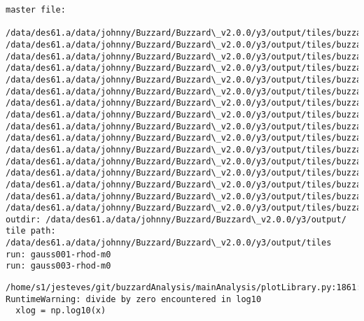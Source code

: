 \documentclass[11pt]{article}
\begin{document}
    \begin{Verbatim}[commandchars=\\\{\}]
master file: 
 /data/des61.a/data/johnny/Buzzard/Buzzard\_v2.0.0/y3/output/tiles/buzzard\_v2.0.0\_copa\_golden\_00000.hdf5
/data/des61.a/data/johnny/Buzzard/Buzzard\_v2.0.0/y3/output/tiles/buzzard\_v2.0.0\_copa\_golden\_00016.hdf5
/data/des61.a/data/johnny/Buzzard/Buzzard\_v2.0.0/y3/output/tiles/buzzard\_v2.0.0\_copa\_golden\_00017.hdf5
/data/des61.a/data/johnny/Buzzard/Buzzard\_v2.0.0/y3/output/tiles/buzzard\_v2.0.0\_copa\_golden\_00018.hdf5
/data/des61.a/data/johnny/Buzzard/Buzzard\_v2.0.0/y3/output/tiles/buzzard\_v2.0.0\_copa\_golden\_00019.hdf5
/data/des61.a/data/johnny/Buzzard/Buzzard\_v2.0.0/y3/output/tiles/buzzard\_v2.0.0\_copa\_golden\_00020.hdf5
/data/des61.a/data/johnny/Buzzard/Buzzard\_v2.0.0/y3/output/tiles/buzzard\_v2.0.0\_copa\_golden\_00022.hdf5
/data/des61.a/data/johnny/Buzzard/Buzzard\_v2.0.0/y3/output/tiles/buzzard\_v2.0.0\_copa\_golden\_00032.hdf5
/data/des61.a/data/johnny/Buzzard/Buzzard\_v2.0.0/y3/output/tiles/buzzard\_v2.0.0\_copa\_golden\_00033.hdf5
/data/des61.a/data/johnny/Buzzard/Buzzard\_v2.0.0/y3/output/tiles/buzzard\_v2.0.0\_copa\_golden\_00034.hdf5
/data/des61.a/data/johnny/Buzzard/Buzzard\_v2.0.0/y3/output/tiles/buzzard\_v2.0.0\_copa\_golden\_00035.hdf5
/data/des61.a/data/johnny/Buzzard/Buzzard\_v2.0.0/y3/output/tiles/buzzard\_v2.0.0\_copa\_golden\_00038.hdf5
/data/des61.a/data/johnny/Buzzard/Buzzard\_v2.0.0/y3/output/tiles/buzzard\_v2.0.0\_copa\_golden\_00044.hdf5
/data/des61.a/data/johnny/Buzzard/Buzzard\_v2.0.0/y3/output/tiles/buzzard\_v2.0.0\_copa\_golden\_00045.hdf5
/data/des61.a/data/johnny/Buzzard/Buzzard\_v2.0.0/y3/output/tiles/buzzard\_v2.0.0\_copa\_golden\_00046.hdf5
/data/des61.a/data/johnny/Buzzard/Buzzard\_v2.0.0/y3/output/tiles/buzzard\_v2.0.0\_copa\_golden\_00047.hdf5
outdir: /data/des61.a/data/johnny/Buzzard/Buzzard\_v2.0.0/y3/output/
tile path: /data/des61.a/data/johnny/Buzzard/Buzzard\_v2.0.0/y3/output/tiles
run: gauss001-rhod-m0
run: gauss003-rhod-m0

    \end{Verbatim}

    \begin{Verbatim}[commandchars=\\\{\}]
/home/s1/jesteves/git/buzzardAnalysis/mainAnalysis/plotLibrary.py:1861: RuntimeWarning: divide by zero encountered in log10
  xlog = np.log10(x)

    \end{Verbatim}
\end{document}
